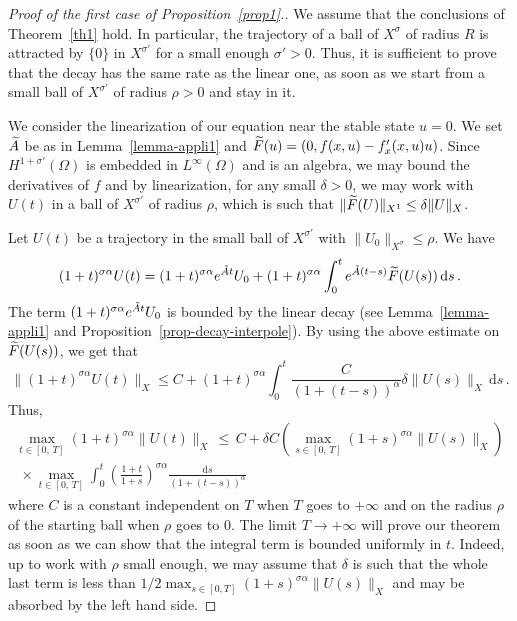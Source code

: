 \documentclass[AHL,Unicode,longabstracts]{cedram}
\newcommand{\drm}{\mathrm{d}}
\let\oldtilde\tilde
\renewcommand*{\tilde}[1]{\mathchoice{\widetilde{#1}}{\widetilde{#1}}{\oldtilde{#1}}{\oldtilde{#1}}}\let\oldexists\exists
\renewcommand*{\exists}{\mathrel{\oldexists}}
\begin{document}
\begin{proof}[{Proof of the first case of Proposition~\ref{prop1}}.] We assume that the conclusions of Theorem~\ref{th1} hold. In particular, the trajectory of a ball of $X^\sigma$ of radius $R$ is attracted by $\{0\}$ in $X^{\sigma'}$ for a small enough $\sigma'>0$. Thus, it is sufficient to prove that the decay has the same rate as the linear one, as soon as we start from a small ball of $X^{\sigma'}$ of radius $\rho>0$ and stay in it.

We consider the linearization of our equation near the stable state $u=0$. We set $\tilde A$ be as in Lemma~\ref{lemma-appli1} and $\tilde F(u)=(0,f(x,u)-f'_x(x,u)u)$. Since $H^{1+\sigma'}(\Omega)$ is embedded in $L^\infty(\Omega)$ and is an algebra, we may bound the derivatives of $f$ and by linearization, for any small $\delta>0$, we may work with $U(t)$ in a ball of $X^{\sigma'}$ of radius $\rho$, which is such that $\|\tilde F(U)\|_{X^1} \leq \delta \|U\|_{X}$.

Let $U(t)$ be a trajectory in the small ball of $X^{\sigma'}$ with $\|U_0\|_{X^\sigma}\leq \rho$. We have
\[
(1+t)^{\sigma\alpha} U(t)=(1+t)^{\sigma\alpha} e^{\tilde At}U_0 +
(1+t)^{\sigma\alpha} \int_0^t e^{\tilde A(t-s)}\tilde F(U(s))\,\drm s\,.
\]
The term $(1+t)^{\sigma\alpha} e^{\tilde At}U_0$ is bounded by the linear decay (see Lemma~\ref{lemma-appli1} and Proposition~\ref{prop-decay-interpole}). By using the above estimate on $\tilde F(U(s))$, we get that
\[
\|(1+t)^{\sigma\alpha} U(t)\|_X \leq C + (1+t)^{\sigma\alpha} \int_0^t
\frac{C}{(1+(t-s))^\alpha}\delta \|U(s)\|_{X}\,\drm s\,.
\]
Thus,
\begin{multline*}
\max_{t\in[0,\,T]} (1+t)^{\sigma\alpha} \|U(t)\|_X\,\leq\, C + \delta C
\left(\max_{s\in [0,\,T]} (1+s)^{\sigma\alpha} \|U(s)\|_X \right) \\ 
\;\times \max_{t\in[0,\,T]}\int_0^t\left(\frac{1+t}{1+s}\right)^{\sigma\alpha} \frac{\drm s}{(1+(t-s))^\alpha}
\end{multline*}
where $C$ is a constant independent on $T$ when $T$ goes to $+\infty$ and on the radius $\rho$ of the starting ball when $\rho$ goes to $0$. The limit $T\rightarrow +\infty$ will prove our theorem as soon as we can show that the integral term is bounded uniformly in $t$. Indeed, up to work with $\rho$ small enough, we may assume that $\delta$ is such that the whole last term is less than $1/2 \max_{s\in [0,T]} (1+s)^{\sigma\alpha} \|U(s)\|_X$ and may be absorbed by the left hand side.


\end{proof}
\end{document}
